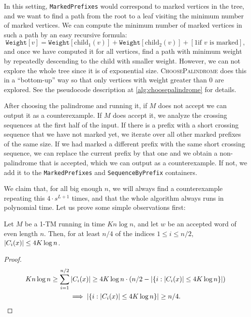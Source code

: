 In this setting, \texttt{MarkedPrefixes} would correspond to marked vertices in the tree, and we want to find a path
from the root to a leaf visiting the minimum number of marked vertices. We can compute the minimum number of marked
vertices in such a path by an easy recursive formula: 
$$\texttt{Weight}[v] = \texttt{Weight}[\text{child}_1(v)] + \texttt{Weight}[\text{child}_2(v)] + [1 \text{if } v \text{ is marked}],$$
and once we have computed it for all vertices, find a path with minimum weight by repeatedly descending
to the child with smaller weight. However, we can not explore the whole tree since it is of exponential size.
\textsc{ChoosePalindrome} does this in a ``bottom-up'' way so that only vertices with weight greater than $0$ are
explored. See the pseudocode description at \cref{alg:choosepalindrome} for details.

After choosing the palindrome and running it, if $M$ does not accept we can output it as a counterexample.
If $M$ does accept it, we analyze the crossing sequences at the first half of the input. If there is a prefix
with a short crossing sequence that we have not marked yet, we iterate over all other marked prefixes of the same
size. If we had marked a different prefix with the same short crossing sequence, we can replace the current prefix
by that one and we obtain a non-palindrome that is accepted, which we can output as a counterexample. If not, we
add it to the \texttt{MarkedPrefixes} and \texttt{SequenceByPrefix} containers.

We claim that, for all big enough $n$, we will always find a counterexample repeating this $4 \cdot s^{L+1}$ times,
and that the whole algorithm always runs in polynomial time. Let us prove some simple observations first:



\begin{lemma}
\label{lem:averageseqlength}
    Let $M$ be a 1-TM running in time $K n \log n$, and let $w$ be an accepted word of even length $n$. Then, for at least 
    $n/4$ of the indices $1 \leq i \leq n/2$, $|C_i(x)| \leq 4K \log n$. 
\end{lemma}
\begin{proof}
\begin{multline*}
K n \log n \geq \sum_{i=1}^{n/2} |C_i(x)| \geq 4K \log n \cdot \left(n/2 - |\{i : |C_i(x)| \leq 4K \log n\}|\right) \\ \implies  |\{i : |C_i(x)| \leq 4K \log n\}| \geq n/4.
\end{multline*}
\end{proof}

